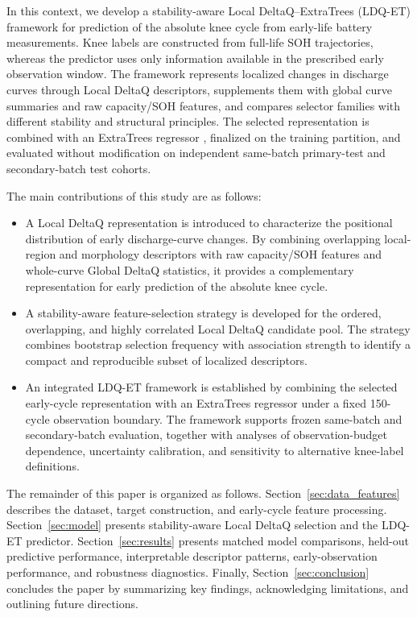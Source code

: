 \documentclass[pdflatex,sn-mathphys-num]{sn-jnl}
\begin{document}
In this context, we develop a stability-aware Local DeltaQ--ExtraTrees (LDQ-ET) framework for prediction of the absolute knee cycle from early-life battery measurements. Knee labels are constructed from full-life SOH trajectories, whereas the predictor uses only information available in the prescribed early observation window. The framework represents localized changes in discharge curves through Local DeltaQ descriptors, supplements them with global curve summaries and raw capacity/SOH features, and compares selector families with different stability and structural principles. The selected representation is combined with an ExtraTrees regressor \cite{geurts2006extremely}, finalized on the training partition, and evaluated without modification on independent same-batch primary-test and secondary-batch test cohorts.

The main contributions of this study are as follows:

\begin{itemize}

\item A Local DeltaQ representation is introduced to characterize the positional distribution of early discharge-curve changes. By combining overlapping local-region and morphology descriptors with raw capacity/SOH features and whole-curve Global DeltaQ statistics, it provides a complementary representation for early prediction of the absolute knee cycle.

\item A stability-aware feature-selection strategy is developed for the ordered, overlapping, and highly correlated Local DeltaQ candidate pool. The strategy combines bootstrap selection frequency with association strength to identify a compact and reproducible subset of localized descriptors.

\item An integrated LDQ-ET framework is established by combining the selected early-cycle representation with an ExtraTrees regressor under a fixed 150-cycle observation boundary. The framework supports frozen same-batch and secondary-batch evaluation, together with analyses of observation-budget dependence, uncertainty calibration, and sensitivity to alternative knee-label definitions.

\end{itemize}

The remainder of this paper is organized as follows. Section~\ref{sec:data_features} describes the dataset, target construction, and early-cycle feature processing. Section~\ref{sec:model} presents stability-aware Local DeltaQ selection and the LDQ-ET predictor. Section~\ref{sec:results} presents matched model comparisons, held-out predictive performance, interpretable descriptor patterns, early-observation performance, and robustness diagnostics. Finally, Section~\ref{sec:conclusion} concludes the paper by summarizing key findings, acknowledging limitations, and outlining future directions.
\end{document}
